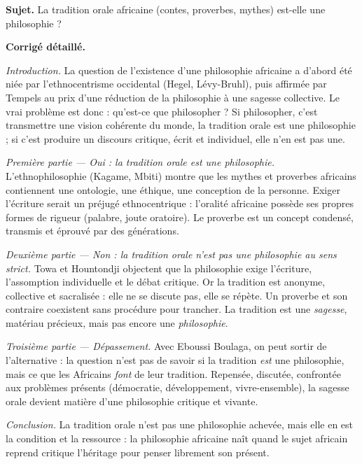 \documentclass[11pt]{article}
\begin{document}
\begin{exoresolu}
\textbf{Sujet.} La tradition orale africaine (contes, proverbes, mythes) est-elle une philosophie ?

\tcblower
\textbf{Corrigé détaillé.}

\emph{Introduction.} La question de l'existence d'une philosophie africaine a d'abord été niée par l'ethnocentrisme occidental (Hegel, Lévy-Bruhl), puis affirmée par Tempels au prix d'une réduction de la philosophie à une sagesse collective. Le vrai problème est donc : qu'est-ce que philosopher ? Si philosopher, c'est transmettre une vision cohérente du monde, la tradition orale est une philosophie ; si c'est produire un discours critique, écrit et individuel, elle n'en est pas une.

\emph{Première partie — Oui : la tradition orale est une philosophie.} L'ethnophilosophie (Kagame, Mbiti) montre que les mythes et proverbes africains contiennent une ontologie, une éthique, une conception de la personne. Exiger l'écriture serait un préjugé ethnocentrique : l'oralité africaine possède ses propres formes de rigueur (palabre, joute oratoire). Le proverbe est un concept condensé, transmis et éprouvé par des générations.

\emph{Deuxième partie — Non : la tradition orale n'est pas une philosophie au sens strict.} Towa et Hountondji objectent que la philosophie exige l'écriture, l'assomption individuelle et le débat critique. Or la tradition est anonyme, collective et sacralisée : elle ne se discute pas, elle se répète. Un proverbe et son contraire coexistent sans procédure pour trancher. La tradition est une \emph{sagesse}, matériau précieux, mais pas encore une \emph{philosophie}.

\emph{Troisième partie — Dépassement.} Avec Eboussi Boulaga, on peut sortir de l'alternative : la question n'est pas de savoir si la tradition \emph{est} une philosophie, mais ce que les Africains \emph{font} de leur tradition. Repensée, discutée, confrontée aux problèmes présents (démocratie, développement, vivre-ensemble), la sagesse orale devient matière d'une philosophie critique et vivante.

\emph{Conclusion.} La tradition orale n'est pas une philosophie achevée, mais elle en est la condition et la ressource : la philosophie africaine naît quand le sujet africain reprend critique l'héritage pour penser librement son présent.
\end{exoresolu}
\end{document}
